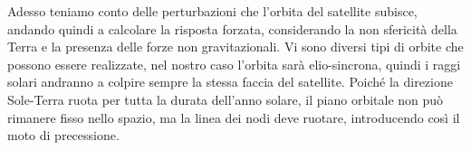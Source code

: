 Adesso teniamo conto delle perturbazioni che l'orbita del satellite subisce,
andando quindi a calcolare la risposta forzata, considerando la non sfericità
della Terra e la presenza delle forze non gravitazionali. Vi sono diversi tipi
di orbite che possono essere realizzate, nel nostro caso l'orbita sarà
elio-sincrona, quindi i raggi solari andranno a colpire sempre la stessa faccia
del satellite. Poiché la direzione Sole-Terra ruota per tutta la durata
dell'anno solare, il piano orbitale non può rimanere fisso nello spazio, ma la
linea dei nodi deve ruotare, introducendo così il moto di precessione.
